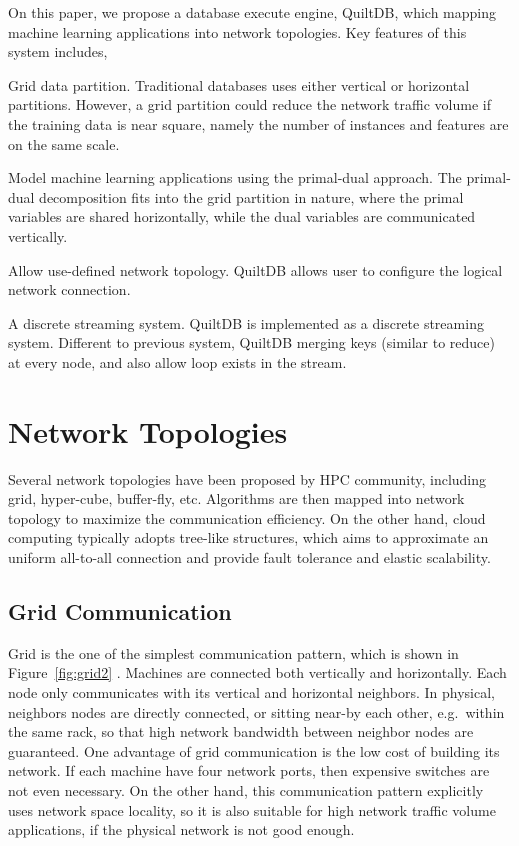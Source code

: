\documentclass[11pt, twocolumn]{article}
\begin{document}
On this paper, we propose a database execute engine, QuiltDB, which mapping
machine learning applications into network topologies. Key features of this
system includes,

\begin{itemize*}
\item Grid data partition. Traditional databases uses either vertical or
  horizontal partitions. However, a grid partition could reduce the network
  traffic volume if the training data is near square, namely the number of
  instances and features are on the same scale.
\item Model machine learning applications using the
  primal-dual approach. The primal-dual decomposition fits into the grid
  partition in nature, where the primal variables are shared horizontally, while
  the dual variables are communicated vertically.
\item Allow use-defined network topology. QuiltDB allows user to configure the
  logical network connection.
\item A discrete streaming system. QuiltDB is implemented as a discrete
  streaming system. Different to previous system, QuiltDB merging keys (similar
  to reduce) at every node, and also allow loop exists in the stream.
\end{itemize*}

\section{Network Topologies}
\label{sec:network-topologies}

Several network topologies have been proposed by HPC community, including grid,
hyper-cube, buffer-fly, etc. Algorithms are then mapped into network topology to
maximize the communication efficiency. On the other hand, cloud computing
typically adopts
tree-like structures, which aims to approximate an uniform all-to-all connection
and provide fault tolerance and elastic scalability.

\subsection{Grid Communication}

Grid is the one of the simplest communication pattern, which is shown in
Figure~\ref{fig:grid2} \cite{DeeBlyGilKesetal04, FosZhaRaiLu08}. Machines are connected both vertically and
horizontally. Each node only communicates with its vertical and horizontal
neighbors. In physical, neighbors nodes are directly connected, or sitting
near-by each other, e.g.~within the same rack,  so that high network bandwidth
between neighbor nodes are guaranteed. One advantage of grid communication is
the low cost of building its network. If each machine have four network ports,
then expensive switches are not even necessary. On the other hand, this
communication pattern explicitly uses network space locality, so it is also
suitable for high network traffic volume applications, if the physical network
is not good enough.
\end{document}
